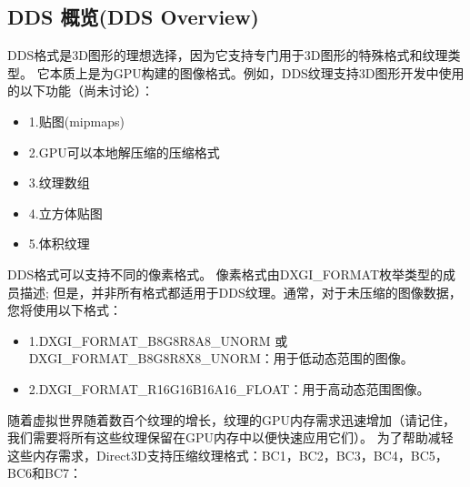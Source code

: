 \subsection{DDS 概览(DDS Overview)}
\begin{flushleft}
DDS格式是3D图形的理想选择，因为它支持专门用于3D图形的特殊格式和纹理类型。 它本质上是为GPU构建的图像格式。例如，DDS纹理支持3D图形开发中使用的以下功能（尚未讨论）：\\
\end{flushleft}

\begin{itemize} 
  \item 1.贴图(mipmaps)
  \item 2.GPU可以本地解压缩的压缩格式
  \item 3.纹理数组
  \item 4.立方体贴图
  \item 5.体积纹理
\end{itemize}

\begin{flushleft}
DDS格式可以支持不同的像素格式。 像素格式由DXGI\_FORMAT枚举类型的成员描述; 但是，并非所有格式都适用于DDS纹理。通常，对于未压缩的图像数据，您将使用以下格式：\\
\end{flushleft}

\begin{itemize} 
  \item 1.DXGI\_FORMAT\_B8G8R8A8\_UNORM 或 DXGI\_FORMAT\_B8G8R8X8\_UNORM：用于低动态范围的图像。
  \item 2.DXGI\_FORMAT\_R16G16B16A16\_FLOAT：用于高动态范围图像。
\end{itemize}

\begin{flushleft}
随着虚拟世界随着数百个纹理的增长，纹理的GPU内存需求迅速增加（请记住，我们需要将所有这些纹理保留在GPU内存中以便快速应用它们）。 为了帮助减轻这些内存需求，Direct3D支持压缩纹理格式：BC1，BC2，BC3，BC4，BC5，BC6和BC7：\\
\end{flushleft}

